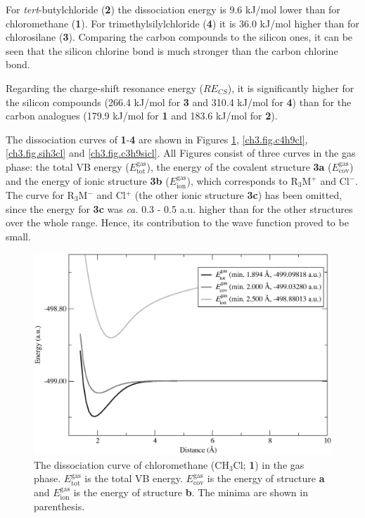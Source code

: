 For \textit{tert}-butylchloride (\textbf{2}) the dissociation energy is 9.6 kJ/mol lower than for chloromethane (\textbf{1}). For trimethylsilylchloride (\textbf{4}) it is 36.0 kJ/mol higher than for chlorosilane (\textbf{3}). Comparing the carbon compounds to the silicon ones, it can be seen that the silicon chlorine bond is much stronger than the carbon chlorine bond.

Regarding the charge-shift resonance energy ($RE_{CS}$), it is significantly higher for the silicon compounds (266.4 kJ/mol for \textbf{3} and 310.4 kJ/mol for \textbf{4}) than for the carbon analogues (179.9 kJ/mol for \textbf{1} and 183.6 kJ/mol for \textbf{2}).

The dissociation curves of \textbf{1}-\textbf{4} are shown in Figures \ref{ch3.fig.ch3cl}, \ref{ch3.fig.c4h9cl}, \ref{ch3.fig.sih3cl} and \ref{ch3.fig.c3h9sicl}. All Figures consist of three curves in the gas phase: the total VB energy ($E_\mathrm{tot}^\mathrm{gas}$), the energy of the covalent structure \textbf{3a} ($E_\mathrm{cov}^\mathrm{gas}$) and the energy of ionic structure \textbf{3b} ($E_\mathrm{ion}^\mathrm{gas}$), which corresponds to R$_3$M$^{+}$ and Cl$^{-}$. The curve for R$_3$M$^{-}$ and Cl$^{+}$ (the other ionic structure \textbf{3c}) has been omitted, since the energy for \textbf{3c} was \textit{ca.} 0.3 - 0.5 a.u. higher than for the other structures over the whole range. Hence, its contribution to the wave function proved to be small.
\begin{figure}[h]
\begin{center}
\includegraphics[scale=0.55]{dissociation/figures/ch3cl_g.eps}
\end{center}
\caption{The dissociation curve of chloromethane (CH$_3$Cl; \textbf{1}) in the gas phase. $E_\mathrm{tot}^\mathrm{gas}$ is the total VB energy. $E_\mathrm{cov}^\mathrm{gas}$ is the energy of structure \textbf{a} and $E_\mathrm{ion}^\mathrm{gas}$ is the energy of structure \textbf{b}. The minima are shown in parenthesis.}
\label{ch3.fig.ch3cl}
\end{figure}

